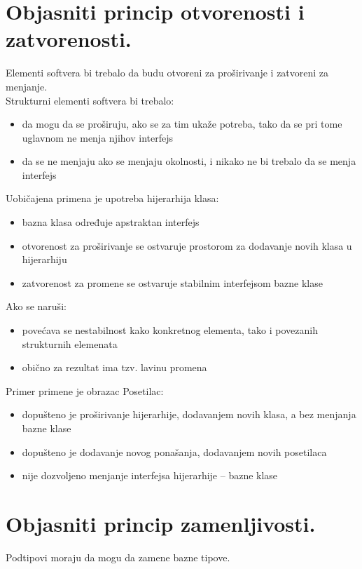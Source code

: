 \documentclass[a4paper]{article}
\begin{document}
\section{Objasniti princip otvorenosti i zatvorenosti.}
Elementi softvera bi trebalo da budu otvoreni za proširivanje i zatvoreni za menjanje.\\

Strukturni elementi softvera bi trebalo:
\begin{itemize}
   \item da mogu da se proširuju, ako se za tim ukaže potreba, tako da se pri tome uglavnom ne menja njihov interfejs
   \item da se ne menjaju ako se menjaju okolnosti, i nikako ne bi trebalo da se menja interfejs\\
\end{itemize}
   
Uobičajena primena je upotreba hijerarhija klasa:
\begin{itemize}
   \item bazna klasa određuje apstraktan interfejs
   \item otvorenost za proširivanje se ostvaruje prostorom za dodavanje novih klasa u hijerarhiju
   \item zatvorenost za promene se ostvaruje stabilnim interfejsom bazne klase\\
\end{itemize}
   
Ako se naruši:
\begin{itemize}
   \item povećava se nestabilnost kako konkretnog elementa, tako i povezanih strukturnih elemenata
   \item obično za rezultat ima tzv. lavinu promena\\
\end{itemize}
   
Primer primene je obrazac Posetilac:
\begin{itemize}
   \item dopušteno je proširivanje hijerarhije, dodavanjem novih klasa, a bez menjanja bazne klase
   \item dopušteno je dodavanje novog ponašanja, dodavanjem novih posetilaca
   \item nije dozvoljeno menjanje interfejsa hijerarhije – bazne klase
\end{itemize}

\section{Objasniti princip zamenljivosti.}
Podtipovi moraju da mogu da zamene bazne tipove.\\
\end{document}
